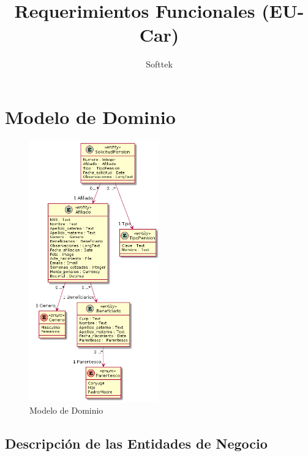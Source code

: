 \documentclass[10pt, letterpaper]{report}
\begin{document}
\title{Requerimientos Funcionales (EU-Car)}
\author{Softtek}
\date{}
\maketitle

\pagestyle{plain}
\tableofcontents

\chapter{Modelo de Dominio}


\begin{figure}[h]
	\label{tab:uml-domain-model}
	\includegraphics[width=0.5\textwidth]{uml-diagrams/domain-model.png}
	\caption{Modelo de Dominio}
\end{figure}

\section{Descripción de las Entidades de Negocio} \label{sec:entity-description}
\end{document}
